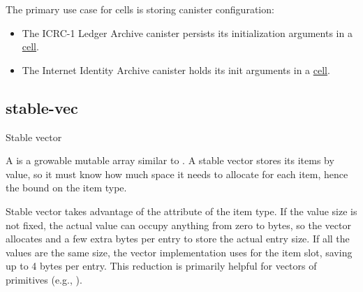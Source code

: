 \documentclass{article}
\begin{document}
The primary use case for cells is storing canister configuration:
\begin{itemize}
  \item The ICRC-1 Ledger Archive canister persists its initialization arguments in a \href{https://github.com/dfinity/ic/blob/9cdb1e62bcd199f28ae0005ed3f762487a1454df/rs/rosetta-api/icrc1/archive/src/main.rs#L49}{cell}.
  \item The Internet Identity Archive canister holds its init arguments in a \href{https://github.com/dfinity/internet-identity/blob/b66fe925fb0a337b09aaaa5beaf1a60994b19f14/src/archive/src/main.rs#L85}{cell}.
\end{itemize}

\subsection{stable-vec}{Stable vector}

A  is a growable mutable array similar to \href{https://doc.rust-lang.org/std/vec/struct.Vec.html}{}.
A stable vector stores its items by value, so it must know how much space it needs to allocate for each item, hence the \href{#bounded-storable-trait}{} bound on the item type.

Stable vector takes advantage of the \href{#is-fixed-size-attribute}{} attribute of the item type.
If the value size is not fixed, the actual value can occupy anything from zero to \href{#max-size-attribute}{} bytes, so the vector allocates \href{#max-size-attribute}{} and a few extra bytes per entry to store the actual entry size.
If all the values are the same size, the vector implementation uses \href{#max-size-attribute}{} for the item slot, saving up to 4 bytes per entry.
This reduction is primarily helpful for vectors of primitives (e.g., ).
\end{document}

